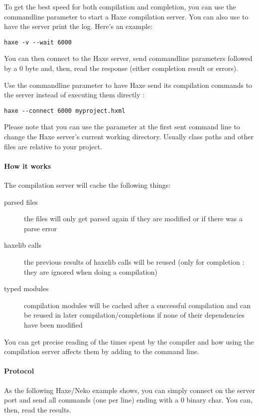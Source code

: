 To get the best speed for both compilation and completion, you can use the  commandline parameter to start a Haxe compilation server. You can also use  to have the server print the log. Here's an example:

\begin{lstlisting}
haxe -v --wait 6000
\end{lstlisting}

You can then connect to the Haxe server, send commandline parameters followed by a 0 byte and, then, read the response (either completion result or errors).

Use the  commandline parameter to have Haxe send its compilation commands to the server instead of executing them directly :

\begin{lstlisting}
haxe --connect 6000 myproject.hxml
\end{lstlisting}

Please note that you can use the parameter  at the first sent command line to change the Haxe server's current working directory. Usually class paths and other files are relative to your project.

\paragraph{How it works}
The compilation server will cache the following things:

\begin{description}
	\item[parsed files] the files will only get parsed again if they are modified or if there was a parse error
	\item[haxelib calls] the previous results of haxelib calls will be reused (only for completion : they are ignored when doing a compilation)
	\item[typed modules] compilation modules will be cached after a successful compilation and can be reused in later compilation/completions if none of their dependencies have been modified
\end{description}

You can get precise reading of the times spent by the compiler and how using the compilation server affects them by adding  to the command line.

\paragraph{Protocol}
As the following Haxe/Neko example shows, you can simply connect on the server port and send all commands (one per line) ending with a 0 binary char. You can, then, read the results.

